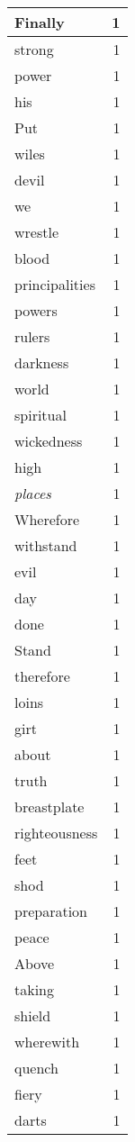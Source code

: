 \begin{center}
\begin{longtable}{l|r}
Finally & 1\\ \hline 
strong & 1\\ \hline 
power & 1\\ \hline 
his & 1\\ \hline 
Put & 1\\ \hline 
wiles & 1\\ \hline 
devil & 1\\ \hline 
we & 1\\ \hline 
wrestle & 1\\ \hline 
blood & 1\\ \hline 
principalities & 1\\ \hline 
powers & 1\\ \hline 
rulers & 1\\ \hline 
darkness & 1\\ \hline 
world & 1\\ \hline 
spiritual & 1\\ \hline 
wickedness & 1\\ \hline 
high & 1\\ \hline 
\emph{places} & 1\\ \hline 
Wherefore & 1\\ \hline 
withstand & 1\\ \hline 
evil & 1\\ \hline 
day & 1\\ \hline 
done & 1\\ \hline 
Stand & 1\\ \hline 
therefore & 1\\ \hline 
loins & 1\\ \hline 
girt & 1\\ \hline 
about & 1\\ \hline 
truth & 1\\ \hline 
breastplate & 1\\ \hline 
righteousness & 1\\ \hline 
feet & 1\\ \hline 
shod & 1\\ \hline 
preparation & 1\\ \hline 
peace & 1\\ \hline 
Above & 1\\ \hline 
taking & 1\\ \hline 
shield & 1\\ \hline 
wherewith & 1\\ \hline 
quench & 1\\ \hline 
fiery & 1\\ \hline 
darts & 1\\ \hline 

\end{longtable}
\end{center}
